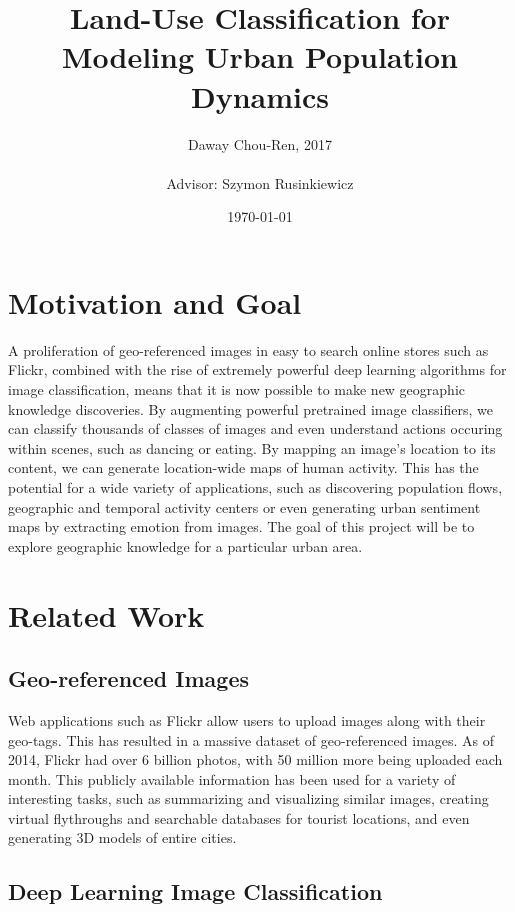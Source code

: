 \documentclass[11pt]{article}
\title{\bf Land-Use Classification for Modeling Urban Population Dynamics}
\date{\today}
\author{Daway Chou-Ren, 2017\\\\
Advisor: Szymon Rusinkiewicz\\
}
\begin{document}
\maketitle



\section{Motivation and Goal} 
A proliferation of geo-referenced images in easy to search online stores such as Flickr, combined with the rise of extremely powerful deep learning algorithms for image classification, means that it is now possible to make new geographic knowledge discoveries. By augmenting powerful pretrained image classifiers, we can classify thousands of classes of images and even understand actions occuring within scenes, such as dancing or eating. By mapping an image's location to its content, we can generate location-wide maps of human activity. This has the potential for a wide variety of applications, such as discovering population flows, geographic and temporal activity centers or even generating urban sentiment maps by extracting emotion from images. The goal of this project will be to explore geographic knowledge for a particular urban area.

\section{Related Work}
\subsection{Geo-referenced Images}
Web applications such as Flickr allow users to upload images along with their geo-tags. This has resulted in a massive dataset of geo-referenced images. As of 2014, Flickr had over 6 billion photos, with 50 million more being uploaded each month. This publicly available information has been used for a variety of interesting tasks, such as summarizing and visualizing similar images, creating virtual flythroughs and searchable databases for tourist locations, and even generating 3D models of entire cities.\cite{jaffe2006generating}\cite{ahern2007world}\cite{agarwal2009building}

\subsection{Deep Learning Image Classification}
\end{document}
